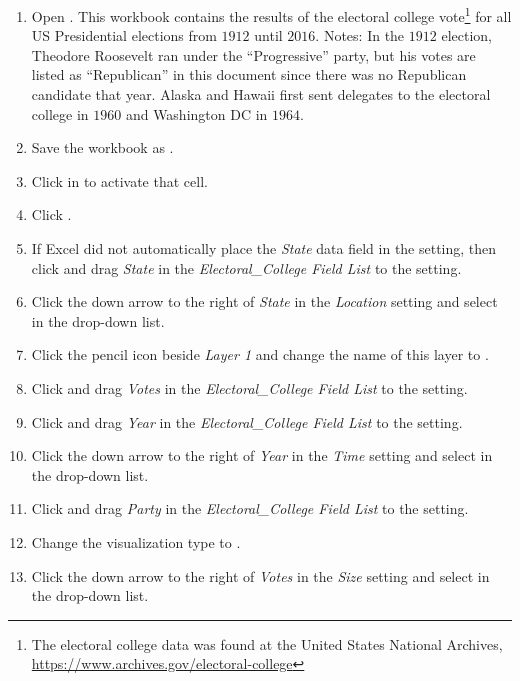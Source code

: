 \begin{enumerate}
	\item Open . This workbook contains the results of the electoral college vote\footnote{The electoral college data was found at the United States National Archives, \url{https://www.archives.gov/electoral-college}} for all US Presidential elections from $ 1912 $ until $ 2016 $. Notes: In the $ 1912 $ election, Theodore Roosevelt ran under the ``Progressive'' party, but his votes are listed as ``Republican'' in this document since there was no Republican candidate that year. Alaska and Hawaii first sent delegates to the electoral college in $ 1960 $ and Washington DC in $ 1964 $.
	\item Save the workbook as .
	\item Click in  to activate that cell.
	\item Click .
	\item If Excel did not automatically place the \textit{State} data field in the  setting, then click and drag \textit{State} in the \textit{Electoral\_College Field List} to the  setting. 
	\item Click the down arrow to the right of \textit{State} in the \textit{Location} setting and select  in the drop-down list.
	\item Click the pencil icon beside \textit{Layer 1} and change the name of this layer to .
	\item Click and drag \textit{Votes} in the \textit{Electoral\_College Field List} to the  setting.
	\item Click and drag \textit{Year} in the \textit{Electoral\_College Field List} to the  setting.
	\item Click the down arrow to the right of \textit{Year} in the \textit{Time} setting and select  in the drop-down list.
	\item Click and drag \textit{Party} in the \textit{Electoral\_College Field List} to the  setting.
	\item Change the visualization type to .
	\item Click the down arrow to the right of \textit{Votes} in the \textit{Size} setting and select  in the drop-down list.

\end{enumerate}
